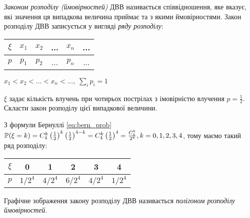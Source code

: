 \begin{definition}
    \emph{Законом розподілу (ймовірностей)} ДВВ називається співвідношення, яке вказує, 
    які значення ця випадкова величина приймає та з якими ймовірностями.
    Закон розподілу ДВВ записується у вигляді \emph{ряду розподілу}:
    \vspace{0.5em}
    
    \hspace{30pt}
    \begin{tabular}{|c|c|c|c|c|c|}
        \hline
        $\xi$ & $x_1$ & $x_2$ & ... & $x_n$ & ... \\
        \hline
        $p$ & $p_1$ & $p_2$ & ... & $p_n$ & ... \\
        \hline
    \end{tabular}
    \hspace{40pt}
    $x_1 < x_2 < ... < x_n < ...,\; \sum\limits_i p_i = 1$
\end{definition}
\begin{example}
    $\xi$ задає кількість влучень при чотирьох пострілах з імовірністю влучення 
    $p = \frac{1}{2}$. Скласти закон розподілу цієї випадкової величини.

    З формули Бернуллі \eqref{eq:bern_prob} $\P(\xi = k) = C_4^k \left(\frac{1}{2}\right)^k \left(\frac{1}{2}\right)^{4-k} = 
    C_4^k \left(\frac{1}{2}\right)^4 = \frac{C_4^k}{2^4}, k = 0,1,2,3,4$, тому маємо такий ряд розподілу:

    \begin{center}
        \begin{tabular}{|c|c|c|c|c|c|}
            \hline
            $\xi$ & 0 & 1 & 2 & 3 & 4 \\
            \hline
            $p$ & $1/2^4$ & $4/2^4$ & $6/2^4$ & $4/2^4$ & $1/2^4$ \\
            \hline
        \end{tabular}
    \end{center}
\end{example}
\begin{definition}
    Графічне зображення закону розподілу ДВВ називається 
    \emph{полігоном розподілу ймовірностей}.
\end{definition}

